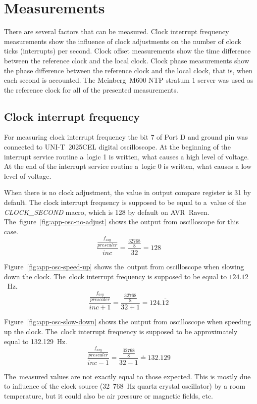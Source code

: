 
\chapter{Measurements}\label{chap:measurements}
There are several factors that can be measured.
Clock interrupt frequency measurements show the influence of clock adjustments
on the number of clock ticks (interrupts) per second.
Clock offset measurements show the time difference between the reference clock and
the local clock.
Clock phase measurements show the phase difference between the reference clock and
the local clock, that is, when each second is accounted.
The Meinberg~M600 NTP stratum 1 server was used as the reference clock
for all of the presented measurements.


\section{Clock interrupt frequency}
For measuring clock interrupt frequency the bit 7 of Port D
and ground pin was connected to UNI-T~2025CEL digital oscilloscope.
At the beginning of the interrupt service routine a~logic 1 is written,
what causes a high level of voltage.
At the end of the interrupt service routine a~logic 0 is written,
what causes a low level of voltage.

When there is no clock adjustment, the value in output compare register is 31 by default.
The clock interrupt frequency
is supposed to be equal to a~value of the {\it{CLOCK\_SECOND}} macro, which is 128 by default on AVR~Raven.
The~figure~\ref{fig:app-osc-no-adjust} shows the output from oscilloscope
for this case.
$$\frac{\frac{f_{asy}}{prescaler}}{inc} = \frac{\frac{32768}{8}}{32} = 128$$

Figure~\ref{fig:app-osc-speed-up} shows the~output from oscilloscope
when slowing down the clock.
The~clock interrupt frequency
is supposed to be equal to $124.\overline{12}$~Hz.
$$\frac{\frac{f_{asy}}{prescaler}}{inc + 1} = \frac{\frac{32768}{8}}{32+1} = 124.\overline{12}$$

Figure~\ref{fig:app-osc-slow-down} shows the output from oscilloscope
when speeding up the clock.
The~clock interrupt frequency
is supposed to be approximately equal to 132.129~Hz.
$$\frac{\frac{f_{asy}}{prescaler}}{inc - 1} = \frac{\frac{32768}{8}}{32-1} \doteq 132.129$$

The~measured values are not exactly equal to those expected.
This is mostly due to influence of the clock source
(32~768~Hz quartz crystal oscillator) by a room temperature,
but it could also be air pressure or magnetic fields, etc.


